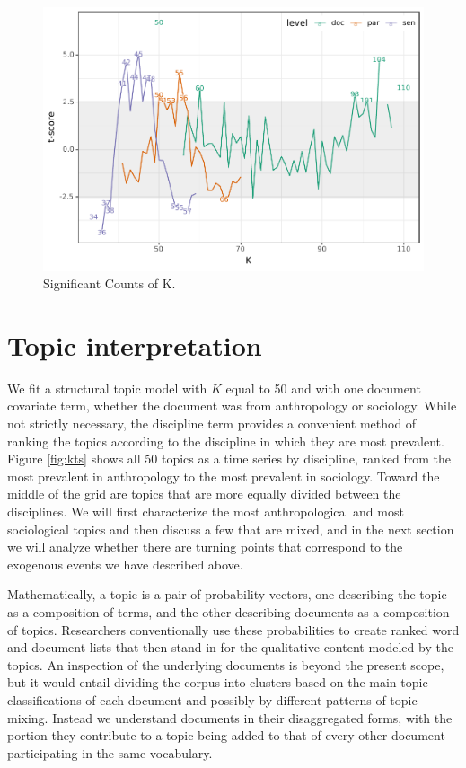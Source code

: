 \documentclass[]{book}
\theoremstyle{definition}
\theoremstyle{definition}
\theoremstyle{definition}
\theoremstyle{remark}
\begin{document}
\begin{figure}

{\centering \includegraphics[width=0.9\linewidth]{04_files/figure-latex/sim-fig2-1} 

}

\caption{Significant Counts of K.}\label{fig:sim-fig2}
\end{figure}

\hypertarget{topic-interpretation-1}{%
\section{\texorpdfstring{ Topic
interpretation}{ Topic interpretation}}\label{topic-interpretation-1}}

We fit a structural topic model with \(K\) equal to 50 and with one
document covariate term, whether the document was from anthropology or
sociology. While not strictly necessary, the discipline term provides a
convenient method of ranking the topics according to the discipline in
which they are most prevalent. Figure \ref{fig:kts} shows all 50 topics
as a time series by discipline, ranked from the most prevalent in
anthropology to the most prevalent in sociology. Toward the middle of
the grid are topics that are more equally divided between the
disciplines. We will first characterize the most anthropological and
most sociological topics and then discuss a few that are mixed, and in
the next section we will analyze whether there are turning points that
correspond to the exogenous events we have described above.

Mathematically, a topic is a pair of probability vectors, one describing
the topic as a composition of terms, and the other describing documents
as a composition of topics. Researchers conventionally use these
probabilities to create ranked word and document lists that then stand
in for the qualitative content modeled by the topics. An inspection of
the underlying documents is beyond the present scope, but it would
entail dividing the corpus into clusters based on the main topic
classifications of each document and possibly by different patterns of
topic mixing. Instead we understand documents in their disaggregated
forms, with the portion they contribute to a topic being added to that
of every other document participating in the same vocabulary.
\end{document}
